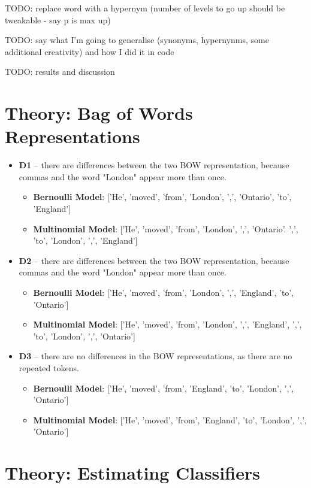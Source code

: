 \documentclass{article}
\begin{document}
TODO: replace word with a hypernym (number of levels to go up should be tweakable - say p is max up)

TODO: say what I'm going to generalise (synonyms, hypernynms, some additional creativity) and how I did it in code

TODO: results and discussion

\section{Theory: Bag of Words Representations}

\begin{itemize}
	\item \textbf{D1} -- there are differences between the two BOW representation, because commas and the word "London" appear more than once. \begin{itemize}
		\item \textbf{Bernoulli Model}: ['He', 'moved', 'from', 'London', ',', 'Ontario', 'to', 'England']
		\item \textbf{Multinomial Model}: ['He', 'moved', 'from', 'London', ',', 'Ontario'. ',', 'to', 'London', ',', 'England']
		\end{itemize}
	\item \textbf{D2} -- there are differences between the two BOW representation, because commas and the word "London" appear more than once. \begin{itemize}
		\item \textbf{Bernoulli Model}: ['He', 'moved', 'from', 'London', ',', 'England', 'to', 'Ontario']
		\item \textbf{Multinomial Model}: ['He', 'moved', 'from', 'London', ',', 'England', ',', 'to', 'London', ',', 'Ontario']
	  \end{itemize}
	\item \textbf{D3} -- there are no differences in the BOW representations, as there are no repeated tokens.
	\begin{itemize}
	\item \textbf{Bernoulli Model}: ['He', 'moved', 'from', 'England', 'to', 'London', ',', 'Ontario']
	\item \textbf{Multinomial Model}: ['He', 'moved', 'from', 'England', 'to', 'London', ',', 'Ontario']
	\end{itemize}
\end{itemize}

\section{Theory: Estimating Classifiers}
\end{document}
